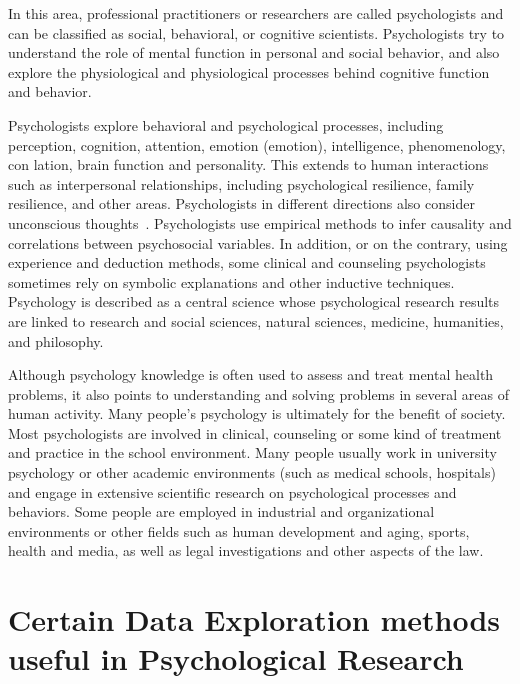 In this area, professional practitioners or researchers are called 
psychologists and can be classified as social, behavioral, or 
cognitive scientists. Psychologists try to understand the role of 
mental function in personal and social behavior, and also explore 
the physiological and physiological processes behind cognitive 
function and behavior.

Psychologists explore behavioral and psychological processes, 
including perception, cognition, attention, emotion (emotion), 
intelligence, phenomenology, con lation, brain function and 
personality. This extends to human interactions such as 
interpersonal relationships, including psychological resilience, 
family resilience, and other areas. Psychologists in different 
directions also consider
 unconscious thoughts~\cite{editor02}. Psychologists use empirical 
methods to infer causality and correlations between psychosocial variables. 
In addition, or on the contrary, using experience and deduction methods,
 some clinical and counseling psychologists sometimes rely on 
symbolic explanations and other inductive techniques. Psychology is 
described as a central science whose psychological research results 
are linked to research and social sciences, natural sciences, 
medicine, humanities, and philosophy.

Although psychology knowledge is often used to assess and treat 
mental health problems, it also points to understanding and solving 
problems in several areas of human activity. Many people's psychology
 is ultimately for the benefit of society. Most psychologists are 
involved in clinical, counseling or some kind of treatment and 
practice in the school environment. Many people usually work in 
university psychology or other academic environments (such as medical
 schools, hospitals) and engage in extensive scientific research on 
psychological processes and behaviors. Some people are employed in 
industrial and organizational environments or other fields such as 
human development and aging, sports, health and media, as well as 
legal investigations and other aspects of the law.


\section{Certain Data Exploration methods useful in Psychological Research}

